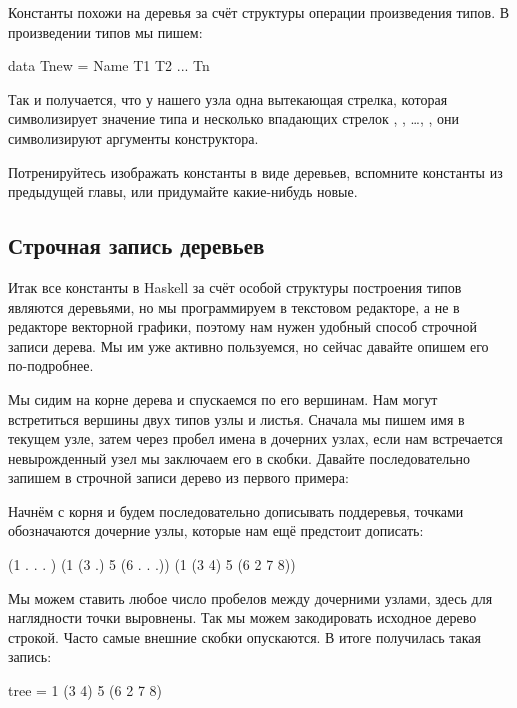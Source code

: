 Константы похожи на деревья за счёт структуры операции произведения
типов. В произведении типов мы пишем:


\begin{code}
data Tnew = Name T1 T2 ... Tn
\end{code}

Так и получается, что у нашего узла  одна вытекающая стрелка,
которая символизирует значение типа  и несколько впадающих
стрелок , , \ldots{}, , они символизируют аргументы
конструктора.

Потренируйтесь изображать константы в виде деревьев, вспомните константы
из предыдущей главы, или придумайте какие-нибудь новые.

\subsection{Строчная запись деревьев}

Итак все константы в Haskell за счёт особой структуры построения типов
являются деревьями, но мы программируем в текстовом редакторе, а не в
редакторе векторной графики, поэтому нам нужен удобный способ строчной
записи дерева. Мы им уже активно пользуемся, но сейчас давайте опишем
его по-подробнее.

Мы сидим на корне дерева и спускаемся по его вершинам. Нам могут
встретиться вершины двух типов узлы и листья. Сначала мы пишем имя в
текущем узле, затем через пробел имена в дочерних узлах, если нам
встречается невырожденный узел мы заключаем его в скобки. Давайте
последовательно запишем в строчной записи дерево из первого примера:


Начнём с корня и будем последовательно дописывать поддеревья, точками
обозначаются дочерние узлы, которые нам ещё предстоит дописать:


\begin{code}
(1     .       .      .       )
(1    (3 .)    5     (6 . . .))
(1    (3 4)    5     (6 2 7 8))
\end{code}

Мы можем ставить любое число пробелов между дочерними узлами, здесь для
наглядности точки выровнены. Так мы можем закодировать исходное дерево
строкой. Часто самые внешние скобки опускаются. В итоге получилась такая
запись:


\begin{code}
tree = 1 (3 4) 5 (6 2 7 8)
\end{code}

